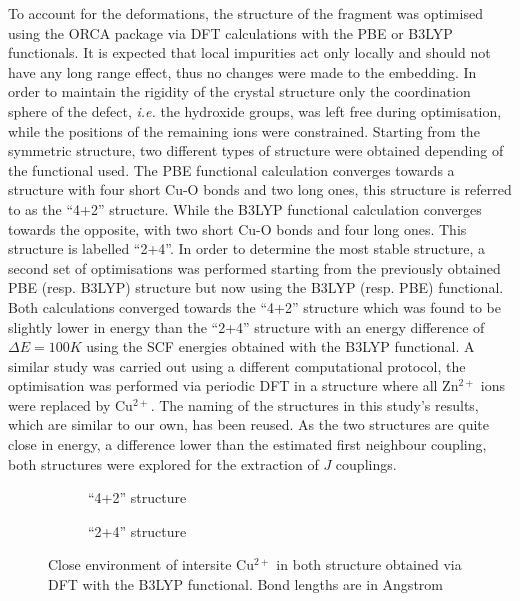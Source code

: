 \documentclass[12pt,a4paper]{report}
\numberwithin{equation}{section}
\begin{document}
To account for the deformations, the structure of the fragment was optimised using the ORCA package via DFT calculations with the PBE or B3LYP functionals.
It is expected that local impurities act only locally and should not have any long range effect, thus no changes were made to the embedding.
In order to maintain the rigidity of the crystal structure only the coordination sphere of the defect, \textit{i.e.} the hydroxide groups, was left free during optimisation, while the positions of the remaining ions were constrained.
Starting from the symmetric structure, two different types of structure were obtained depending of the functional used.
The PBE functional calculation converges towards a structure with four short Cu-O bonds and two long ones, this structure is referred to as the ``4+2'' structure.
While the B3LYP functional calculation converges towards the opposite, with two short Cu-O bonds and four long ones. This structure is labelled ``2+4''.
In order to determine the most stable structure, a second set of optimisations was performed starting from the previously obtained PBE (resp. B3LYP) structure but now using the B3LYP (resp. PBE) functional.
Both calculations converged towards the ``4+2'' structure which was found to be slightly lower in energy than the ``2+4'' structure with an energy difference of $\Delta E=100 K$ using the SCF energies obtained with the B3LYP functional.
A similar study\cite{janson_dft-based_2012-1} was carried out using a different computational protocol, the optimisation was performed via periodic DFT in a structure where all Zn$^{2+}$ ions were replaced by Cu$^{2+}$. 
The naming of the structures in this study's results, which are similar to our own, has been reused.
As the two structures are quite close in energy, a difference lower than the estimated first neighbour coupling, both structures were explored for the extraction of $J$ couplings.

\begin{figure}[!ht]
    \centering
    \begin{subfigure}{.5\textwidth}
      \centering
      \caption{``4+2'' structure}
      \label{fig:Struc4+2}
    \end{subfigure}%
    \begin{subfigure}{.5\textwidth}
      \centering
      \caption{``2+4'' structure}
      \label{fig:Struc2+4}
    \end{subfigure}
    \caption[Close environnment of intersite Cu$^{2+}$ in both structure obtained via DFT with the B3LYP functional]{Close environment of intersite Cu$^{2+}$ in both structure obtained via DFT with the B3LYP functional. Bond lengths are in Angstrom}
    \label{fig:StrucInterplan}
\end{figure}
\end{document}
